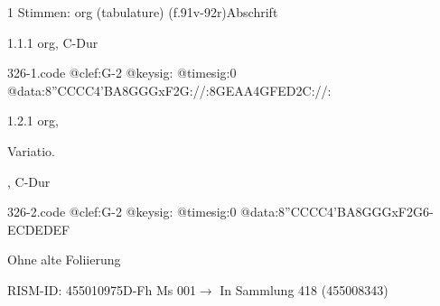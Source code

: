 \documentclass[twocolumn, 12pt]{book}
\begin{document}
\par \textcolor{darkblue}{}  1 Stimmen: org (tabulature)  (f.91v-92r)\newline Abschrift
\par 1.1.1  org, C-Dur  
\begin{filecontents*}{326-1.code}
@clef:G-2
@keysig:
@timesig:0
@data:8''CCCC4'BA8GGGxF2G://:8GEAA4GFED2C://:
\end{filecontents*}
\newline %
\par 1.2.1  org, \begin{itshape}Variatio.\end{itshape}, C-Dur  
\begin{filecontents*}{326-2.code}
@clef:G-2
@keysig:
@timesig:0
@data:8''CCCC4'BA8GGGxF2G6-{ECD}{EDEF}
\end{filecontents*}
\newline %
\par Ohne alte Foliierung
\par RISM-ID: 455010975\newline D-Fh  Ms 001\newline $\rightarrow$ In Sammlung 418 (455008343)
      
\end{document}
